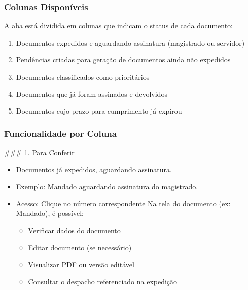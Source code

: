 \documentclass[letterpaper,10pt,brazil]{sphinxmanual}
\begin{document}
\subsubsection{Colunas Disponíveis}
\label{\detokenize{projud_09_outroscumprimentos:colunas-disponiveis}}
\sphinxAtStartPar
A aba está dividida em colunas que indicam o status de cada documento:
\begin{enumerate}
%
\item {} 
\sphinxAtStartPar
{} \textendash{} Documentos expedidos e aguardando assinatura (magistrado ou servidor)

\item {} 
\sphinxAtStartPar
{} \textendash{} Pendências criadas para geração de documentos ainda não expedidos

\item {} 
\sphinxAtStartPar
{} \textendash{} Documentos classificados como prioritários

\item {} 
\sphinxAtStartPar
{} \textendash{} Documentos que já foram assinados e devolvidos

\item {} 
\sphinxAtStartPar
{} \textendash{} Documentos cujo prazo para cumprimento já expirou

\end{enumerate}


\subsubsection{Funcionalidade por Coluna}
\label{\detokenize{projud_09_outroscumprimentos:funcionalidade-por-coluna}}
\sphinxAtStartPar
\#\#\# 1. Para Conferir
\begin{itemize}
\item {} 
\sphinxAtStartPar
Documentos já expedidos, aguardando assinatura.

\item {} 
\sphinxAtStartPar
Exemplo: Mandado aguardando assinatura do magistrado.

\item {} 
\sphinxAtStartPar
Acesso:
\sphinxhyphen{} Clique no número correspondente
\sphinxhyphen{} Na tela do documento (ex: Mandado), é possível:
\begin{itemize}
\item {} 
\sphinxAtStartPar
Verificar dados do documento

\item {} 
\sphinxAtStartPar
Editar documento (se necessário)

\item {} 
\sphinxAtStartPar
Visualizar PDF ou versão editável

\item {} 
\sphinxAtStartPar
Consultar o despacho referenciado na expedição

\end{itemize}

\end{itemize}
\end{document}
